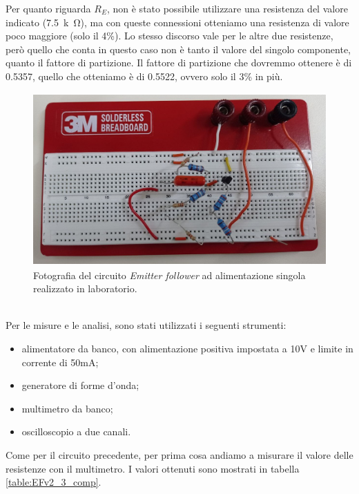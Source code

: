 \documentclass{report}
\begin{document}
Per quanto riguarda $R_E$, non è stato possibile utilizzare una resistenza del valore indicato (\SI{7.5}{k\ohm}), ma con queste connessioni otteniamo una resistenza di valore poco maggiore (solo il 4\%). Lo stesso discorso vale per le altre due resistenze, però quello che conta in questo caso non è tanto il valore del singolo componente, quanto il fattore di partizione. Il fattore di partizione che dovremmo ottenere è di 0.5357, quello che otteniamo è di 0.5522, ovvero solo il 3\% in più.
\begin{figure}[h]
\centering
\includegraphics[height=6.6cm]{immagini/fotoEFv2_3}
\caption{Fotografia del circuito \textit{Emitter follower} ad alimentazione singola realizzato in laboratorio.}
\label{figura:fotoEFv2_3}
\end{figure}
\\Per le misure e le analisi, sono stati utilizzati i seguenti strumenti:
\begin{itemize}
\item alimentatore da banco, con alimentazione positiva impostata a 10V e limite in corrente di 50mA;
\item generatore di forme d'onda;
\item multimetro da banco;
\item oscilloscopio a due canali.
\end{itemize}
Come per il circuito precedente, per prima cosa andiamo a misurare il valore delle resistenze con il multimetro. I valori ottenuti sono mostrati in tabella \ref{table:EFv2_3_comp}.
\\
\end{document}
